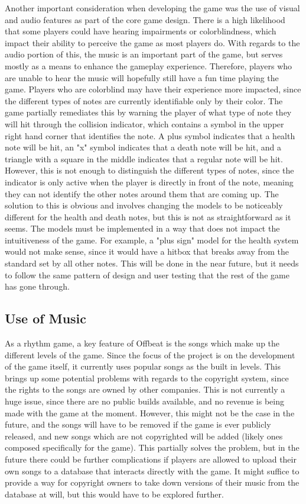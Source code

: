 \documentclass[10pt,twocolumn]{article}
\begin{document}
Another important consideration when developing the game was the use of visual and audio features as part of the core game design. There is a high likelihood that some players could have hearing impairments or colorblindness, which impact their ability to perceive the game as most players do. With regards to the audio portion of this, the music is an important part of the game, but serves mostly as a means to enhance the gameplay experience. Therefore, players who are unable to hear the music will hopefully still have a fun time playing the game. Players who are colorblind may have their experience more impacted, since the different types of notes are currently identifiable only by their color. The game partially remediates this by warning the player of what type of note they will hit through the collision indicator, which contains a symbol in the upper right hand corner that identifies the note. A plus symbol indicates that a health note will be hit, an "x" symbol indicates that a death note will be hit, and a triangle with a square in the middle indicates that a regular note will be hit. However, this is not enough to distinguish the different types of notes, since the indicator is only active when the player is directly in front of the note, meaning they can not identify the other notes around them that are coming up. The solution to this is obvious and involves changing the models to be noticeably different for the health and death notes, but this is not as straightforward as it seems. The models must be implemented in a way that does not impact the intuitiveness of the game. For example, a "plus sign" model for the health system would not make sense, since it would have a hitbox that breaks away from the standard set by all other notes. This will be done in the near future, but it needs to follow the same pattern of design and user testing that the rest of the game has gone through.

\subsection{Use of Music}
As a rhythm game, a key feature of Offbeat is the songs which make up the different levels of the game. Since the focus of the project is on the development of the game itself, it currently uses popular songs as the built in levels. This brings up some potential problems with regards to the copyright system, since the rights to the songs are owned by other companies. This is not currently a huge issue, since there are no public builds available, and no revenue is being made with the game at the moment. However, this might not be the case in the future, and the songs will have to be removed if the game is ever publicly released, and new songs which are not copyrighted will be added (likely ones composed specifically for the game). This partially solves the problem, but in the future there could be further complications if players are allowed to upload their own songs to a database that interacts directly with the game. It might suffice to provide a way for copyright owners to take down versions of their music from the database at will, but this would have to be explored further.
\end{document}
